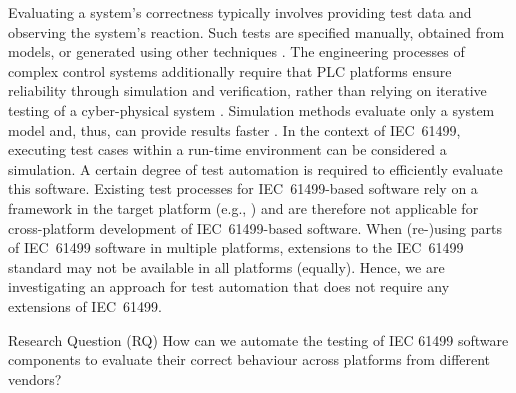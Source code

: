 Evaluating a system's correctness typically involves providing test data and observing the system's reaction. Such tests are specified manually, obtained from models, or generated using other techniques \cite{Sinha.2019}. The engineering processes of complex control systems additionally require that PLC platforms ensure reliability through simulation and verification, rather than relying on iterative testing of a cyber-physical system \cite{Sehr.2021}. Simulation methods evaluate only a system model and, thus, can provide results faster \cite{Sinha.2019}. In the context of IEC~61499, executing test cases within a run-time environment can be considered a simulation. A certain degree of test automation is required to efficiently evaluate this software. Existing test processes for IEC~61499-based software rely on a framework in the target platform (e.g., \cite{hametner2014}) and are therefore not applicable for cross-platform development of IEC~61499-based software. When (re-)using parts of IEC~61499 software in multiple platforms, extensions to the IEC~61499 standard may not be available in all platforms (equally). Hence, we are investigating an approach for test automation that does not require any extensions of IEC~61499.


\begin{rquestion}{Research Question (RQ)}
    How can we automate the testing of IEC 61499 software components to evaluate their correct behaviour across platforms from different vendors?
\end{rquestion}

